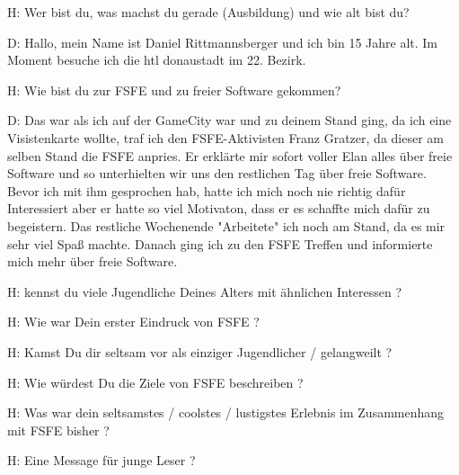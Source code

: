 
H: Wer bist du, was machst du gerade (Ausbildung) und wie alt bist du?


D: Hallo, mein Name ist Daniel Rittmannsberger und ich bin 15 Jahre alt. Im Moment besuche ich die htl donaustadt im 22. Bezirk.





H: Wie bist du zur FSFE und zu freier Software gekommen?


D: Das war als ich auf der GameCity war und zu deinem Stand ging, da ich eine Visistenkarte wollte, traf ich den FSFE-Aktivisten
   Franz Gratzer, da dieser am selben Stand die FSFE anpries. Er erklärte mir sofort voller Elan alles über freie Software und so
   unterhielten wir uns den restlichen Tag über freie Software. Bevor ich mit ihm gesprochen hab, hatte ich mich noch nie
   richtig dafür Interessiert aber er hatte so viel Motivaton, dass er es schaffte mich dafür zu begeistern. Das restliche
   Wochenende "Arbeitete" ich noch am Stand, da es mir sehr viel Spaß machte. Danach ging ich zu den FSFE Treffen und
   informierte mich mehr über freie Software.





H: kennst du viele Jugendliche Deines Alters mit ähnlichen Interessen ?



H: Wie war Dein erster Eindruck von FSFE ?



H: Kamst Du dir seltsam vor als einziger Jugendlicher / gelangweilt ?


H: Wie würdest Du die Ziele von FSFE beschreiben ?


H: Was war dein seltsamstes / coolstes / lustigstes Erlebnis im Zusammenhang mit FSFE bisher ?


H: Eine Message für junge Leser ?

